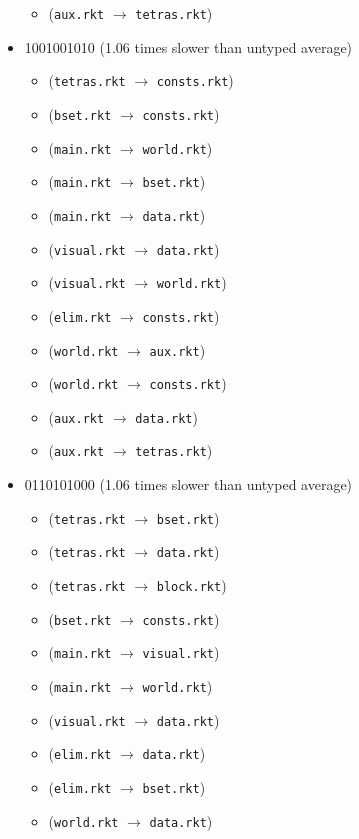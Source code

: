 \documentclass{article}
\newcommand{\mono}[1]{\texttt{#1}}
\begin{document}
\begin{itemize}
\begin{itemize}
  \item (\mono{aux.rkt} $\rightarrow$ \mono{tetras.rkt})
  \end{itemize}
\item 1001001010 (1.06 times slower than untyped average)
  \begin{itemize}
  \item (\mono{tetras.rkt} $\rightarrow$ \mono{consts.rkt})
  \item (\mono{bset.rkt} $\rightarrow$ \mono{consts.rkt})
  \item (\mono{main.rkt} $\rightarrow$ \mono{world.rkt})
  \item (\mono{main.rkt} $\rightarrow$ \mono{bset.rkt})
  \item (\mono{main.rkt} $\rightarrow$ \mono{data.rkt})
  \item (\mono{visual.rkt} $\rightarrow$ \mono{data.rkt})
  \item (\mono{visual.rkt} $\rightarrow$ \mono{world.rkt})
  \item (\mono{elim.rkt} $\rightarrow$ \mono{consts.rkt})
  \item (\mono{world.rkt} $\rightarrow$ \mono{aux.rkt})
  \item (\mono{world.rkt} $\rightarrow$ \mono{consts.rkt})
  \item (\mono{aux.rkt} $\rightarrow$ \mono{data.rkt})
  \item (\mono{aux.rkt} $\rightarrow$ \mono{tetras.rkt})
  \end{itemize}
\item 0110101000 (1.06 times slower than untyped average)
  \begin{itemize}
  \item (\mono{tetras.rkt} $\rightarrow$ \mono{bset.rkt})
  \item (\mono{tetras.rkt} $\rightarrow$ \mono{data.rkt})
  \item (\mono{tetras.rkt} $\rightarrow$ \mono{block.rkt})
  \item (\mono{bset.rkt} $\rightarrow$ \mono{consts.rkt})
  \item (\mono{main.rkt} $\rightarrow$ \mono{visual.rkt})
  \item (\mono{main.rkt} $\rightarrow$ \mono{world.rkt})
  \item (\mono{visual.rkt} $\rightarrow$ \mono{data.rkt})
  \item (\mono{elim.rkt} $\rightarrow$ \mono{data.rkt})
  \item (\mono{elim.rkt} $\rightarrow$ \mono{bset.rkt})
  \item (\mono{world.rkt} $\rightarrow$ \mono{data.rkt})

\end{itemize}
\end{itemize}
\end{document}
